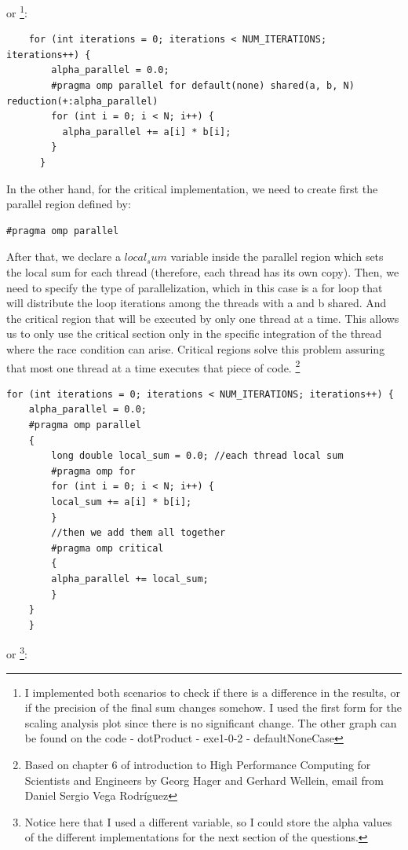 \documentclass[unicode,11pt,a4paper,oneside,numbers=endperiod,openany]{scrartcl}
\begin{document}
or \footnote{I implemented both scenarios to check if there is a difference in the results, or if the precision of the final sum changes somehow.
I used the first form for the scaling analysis plot since there is no significant change. The other graph can be found on the code - dotProduct - exe1-0-2 - defaultNoneCase}:

\begin{lstlisting}
    for (int iterations = 0; iterations < NUM_ITERATIONS; iterations++) {
        alpha_parallel = 0.0;
        #pragma omp parallel for default(none) shared(a, b, N) reduction(+:alpha_parallel)
        for (int i = 0; i < N; i++) {
          alpha_parallel += a[i] * b[i];
        }
      }
\end{lstlisting}

In the other hand, for the critical implementation, we need to create first the parallel region defined by:
\begin{lstlisting}
#pragma omp parallel
\end{lstlisting}
After that, we declare a $local_sum$ variable inside the parallel region which sets the local sum for each thread (therefore, each thread has its own copy). 
Then, we need to specify the type of parallelization, which in this case is a for loop that will distribute the loop iterations among the threads with a and b shared.
And the critical region that will be executed by only one thread at a time. This allows us to only use the critical section only in the specific integration of the thread where the race 
condition can arise. Critical regions solve this problem assuring that most one thread at a time executes that piece of code. \footnote{ Based on chapter 6 of introduction to High Performance Computing for Scientists and Engineers by Georg Hager and Gerhard Wellein,
email from Daniel Sergio Vega Rodríguez}
\begin{lstlisting}
for (int iterations = 0; iterations < NUM_ITERATIONS; iterations++) {
    alpha_parallel = 0.0;
    #pragma omp parallel
    {
        long double local_sum = 0.0; //each thread local sum
        #pragma omp for
        for (int i = 0; i < N; i++) {
        local_sum += a[i] * b[i];
        }
        //then we add them all together
        #pragma omp critical
        {
        alpha_parallel += local_sum;
        }
    }
    }
\end{lstlisting}

or \footnote{Notice here that I used a different variable, so I could store the alpha values
of the different implementations for the next section of the questions.}: 
\end{document}
